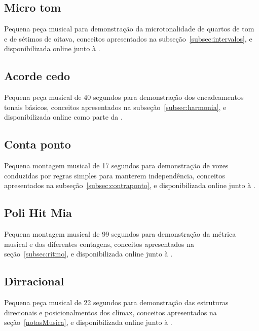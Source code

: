 \subsection{Micro tom}\label{ap:micro}
Pequena peça musical para demonstração da microtonalidade de quartos de tom e de sétimos de oitava, conceitos apresentados na subseção~\ref{subsec:intervalos}, e disponibilizada online junto à \massa.\cite{MASSA}



\clearpage
\subsection{Acorde cedo}\label{ap:acorde}
Pequena peça musical de 40 segundos para demonstração dos encadeamentos tonais básicos, conceitos apresentados na subseção~\ref{subsec:harmonia}, e disponibilizada online como parte da \massa.\cite{MASSA}

\clearpage

\subsection{Conta ponto}\label{ap:conta}
Pequena montagem musical de 17 segundos para demonstração de vozes conduzidas por regras simples para manterem independência, conceitos apresentados na subseção~\ref{subsec:contraponto}, e disponibilizada online junto à \massa.\cite{MASSA}


\clearpage


\subsection{Poli Hit Mia}\label{ap:poli}
Pequena montagem musical de 99 segundos para demonstração da métrica musical e das diferentes contagens, conceitos apresentados na seção~\ref{subsec:ritmo}, e disponibilizada online junto à \massa.\cite{MASSA}


\clearpage

\subsection{Dirracional}\label{ap:dirracional}
Pequena peça musical de 22 segundos para demonstração das estruturas direcionais e posicionalmentos dos clímax, conceitos apresentados na seção~\ref{notasMusica}, e disponibilizada online junto à \massa.\cite{MASSA}


